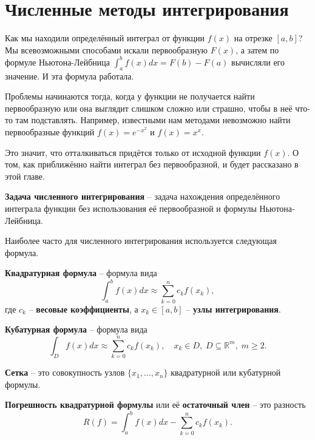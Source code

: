 \documentclass[../main.tex]{subfile}
\begin{document}
\section{Численные методы интегрирования}

Как мы находили определённый интеграл от функции $f(x)$ на отрезке $[a,b]$? Мы
всевозможными способами искали первообразную $F(x)$, а затем по формуле
Ньютона-Лейбница $\int_a^bf(x)dx=F(b)-F(a)$ вычисляли его значение. И эта
формула работала.

Проблемы начинаются тогда, когда у функции не получается найти первообразную
или она выглядит слишком сложно или страшно, чтобы в неё что-то там подставлять. Например,
известными нам методами невозможно найти первообразные функций $f(x)=e^{-x^2}$
и $f(x)=x^x$.

Это значит, что отталкиваться придётся только от исходной функции $f(x)$. О том,
как приближённо найти интеграл без первообразной, и будет рассказано в этой главе.

\begin{define}
	\textbf{Задача численного интегрирования} -- задача нахождения
	определённого интеграла функции без использования её первообразной и
	формулы Ньютона-Лейбница.
\end{define}

Наиболее часто для численного интегрирования используется следующая формула.

\begin{define}
	\textbf{Квадратурная формула} -- формула вида
	\[\int_a^bf(x)dx\approx\sum_{k=0}^n c_kf(x_k),\]
	где $c_k$ -- \textbf{весовые коэффициенты}, а $x_k\in[a,b]$ --
	\textbf{узлы интегрирования}.
\end{define}

\begin{define}
	\textbf{Кубатурная формула} -- формула вида
	\[\int_{D}f(x)dx\approx\sum_{k=0}^n c_k f(x_k),\quad x_k\in D,\;D
	\subseteq\mathbb R^m,\;m\ge 2.\]
\end{define}

\begin{define}
	\textbf{Сетка} -- это совокупность узлов $\{x_1,...,x_n\}$ квадратурной
	или кубатурной формулы.
\end{define}

\begin{define}
	\textbf{Погрешность квадратурной формулы} или её \textbf{остаточный
	член} -- это разность
	\[R(f)=\int_a^b f(x)dx - \sum_{k=0}^n c_kf(x_k).\]
\end{define}
\end{document}
